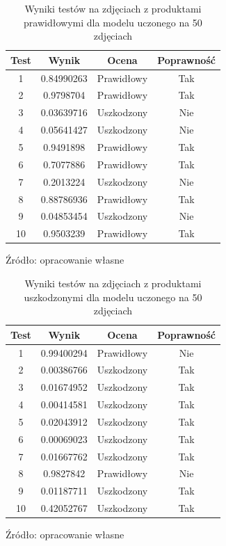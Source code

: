 \begin{table}[H]
\centering
\caption{Wyniki testów na zdjęciach z produktami prawidłowymi dla modelu uczonego na 50 zdjęciach}
\begin{tabular}{|c|c|c|c|}
\hline
\textbf{Test} & \textbf{Wynik} & \textbf{Ocena} & \textbf{Poprawność} \\ \hline
1  & 0.84990263 & Prawidłowy & Tak \\ \hline
2  & 0.9798704 & Prawidłowy & Tak \\ \hline
3  & 0.03639716 & Uszkodzony & Nie \\ \hline
4  & 0.05641427 & Uszkodzony & Nie \\ \hline
5  & 0.9491898 & Prawidłowy & Tak  \\ \hline
6  & 0.7077886 & Prawidłowy & Tak  \\ \hline
7  & 0.2013224 & Uszkodzony & Nie  \\ \hline
8  & 0.88786936 & Prawidłowy & Tak \\ \hline
9  & 0.04853454 & Uszkodzony & Nie \\ \hline
10  & 0.9503239 & Prawidłowy & Tak \\ \hline
\end{tabular}
\begin{center}
\footnotesize{Źródło: opracowanie własne}
\end{center}
\label{tab:test_results_prawidlowe_50}
\end{table}

\begin{table}[H]
\centering
\caption{Wyniki testów na zdjęciach z produktami uszkodzonymi dla modelu uczonego na 50 zdjęciach}
\begin{tabular}{|c|c|c|c|}
\hline
\textbf{Test} & \textbf{Wynik} & \textbf{Ocena} & \textbf{Poprawność} \\ \hline
1  & 0.99400294 & Prawidłowy & Nie \\ \hline
2  & 0.00386766 & Uszkodzony & Tak \\ \hline
3  & 0.01674952 & Uszkodzony & Tak \\ \hline
4  & 0.00414581 & Uszkodzony & Tak \\ \hline
5  & 0.02043912 & Uszkodzony & Tak \\ \hline
6  & 0.00069023 & Uszkodzony & Tak \\ \hline
7  & 0.01667762 & Uszkodzony & Tak \\ \hline
8  & 0.9827842 & Prawidłowy & Nie \\ \hline
9  & 0.01187711 & Uszkodzony & Tak \\ \hline
10  & 0.42052767 & Uszkodzony & Tak \\ \hline
\end{tabular}
\begin{center}
\footnotesize{Źródło: opracowanie własne}
\end{center}
\label{tab:test_results_uszkodzone_50}
\end{table}

